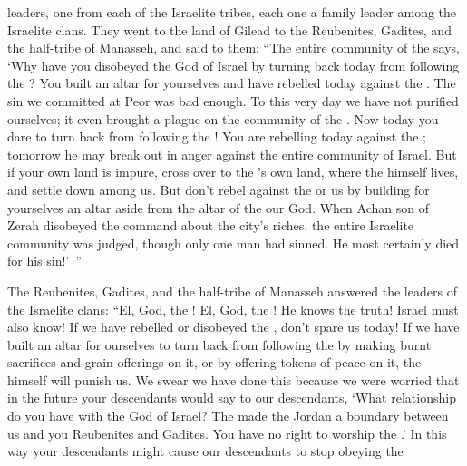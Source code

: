 {leaders,
one
from each
of the Israelite
tribes,
each one
a family
leader
among the Israelite clans.
They went
to
the land
of Gilead
to
the Reubenites,
Gadites,
and the half-tribe
of Manasseh,
and said
to them:
“The
entire
community
of the {}
says,
‘Why
have you disobeyed
the God
of Israel
by turning
back
today
from following
the {}? You built
an altar
for yourselves and have rebelled
today
against the
{}.
The sin
we committed at Peor
was bad enough.
To this
very
day
we have
not
purified
ourselves;
it even
brought a plague
on the community
of the {}.
Now today
you
dare to turn back
from following
the {}! You
are rebelling
today
against the
{}; tomorrow
he may break out in anger
against the entire
community
of Israel.
But
if
your own
land
is impure,
cross over
to
the
{}’s
own
land,
where the
{}
himself lives,
and settle down
among
us. But don’t
rebel
against
the {}
or
us
by building
for yourselves an altar
aside
from the altar
of the {}
our God.
When Achan
son
of Zerah
disobeyed
the command about the city’s
riches,
the entire
Israelite
community
was judged,
though
only one
man
had sinned. He most certainly
died
for his sin!’ ”
\par }{\PP {}The Reubenites,
Gadites,
and the half-tribe
of Manasseh
answered
the leaders
of the Israelite clans:
“El,
God,
the {}! El,
God,
the {}! He knows
the truth! Israel
must also know! If
we have rebelled
or
disobeyed
the {}, don’t
spare
us today!
If we have built
an altar
for ourselves to turn back
from following
the {}
by making burnt sacrifices
and grain offerings
on it,
or
by
offering tokens of peace
on
it, the
{}
himself will punish us.
We swear we have done
this
because we were worried
that in the future
your descendants
would say
to our descendants,
‘What
relationship do you have with the
{}
God
of Israel?
The
{}
made the Jordan
a boundary
between
us and you Reubenites
and Gadites.
You have no
right to worship
the {}.’ In this way
your descendants
might cause our descendants
to stop
obeying
the

}

